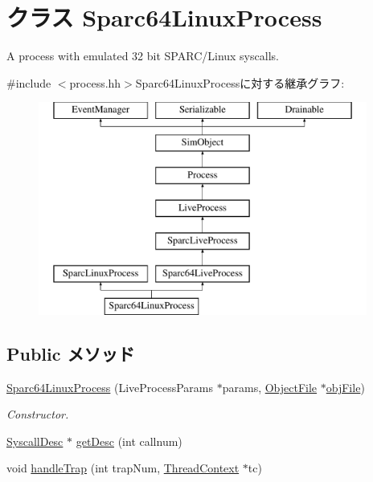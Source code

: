 \hypertarget{classSparcISA_1_1Sparc64LinuxProcess}{
\section{クラス Sparc64LinuxProcess}
\label{classSparcISA_1_1Sparc64LinuxProcess}
}


A process with emulated 32 bit SPARC/Linux syscalls.  


{\ttfamily \#include $<$process.hh$>$}Sparc64LinuxProcessに対する継承グラフ:\begin{figure}[H]
\begin{center}
\leavevmode
\includegraphics[height=7cm]{classSparcISA_1_1Sparc64LinuxProcess}
\end{center}
\end{figure}
\subsection*{Public メソッド}
\begin{DoxyCompactItemize}
\item 
\hyperlink{classSparcISA_1_1Sparc64LinuxProcess_a793e03fda97beecb28b9dd17ef791f15}{Sparc64LinuxProcess} (LiveProcessParams $\ast$params, \hyperlink{classObjectFile}{ObjectFile} $\ast$\hyperlink{classLiveProcess_ab6cfcfa7903c66267b3e0351c3caa809}{objFile})
\begin{DoxyCompactList}\small\item\em Constructor. \item\end{DoxyCompactList}\item 
\hyperlink{classSyscallDesc}{SyscallDesc} $\ast$ \hyperlink{classSparcISA_1_1Sparc64LinuxProcess_a85e8ccf0c435d95c14574f0a217f5116}{getDesc} (int callnum)
\item 
void \hyperlink{classSparcISA_1_1Sparc64LinuxProcess_a7737d67ba76be0bd3beb0bd0dc93333a}{handleTrap} (int trapNum, \hyperlink{classThreadContext}{ThreadContext} $\ast$tc)
\end{DoxyCompactItemize}


